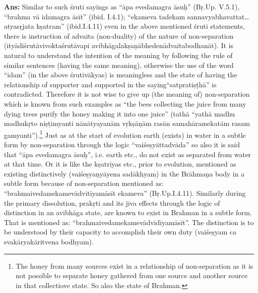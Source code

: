 \textbf{Ans:} Similar to such śruti sayings as “āpa evedamagra āsuḥ” (Bṛ.Up. V.5.1), “brahma vā idamagra āsīt” (ibid. I.4.1); “ekameva tadekam sannavyabhavattat…atyasṛjata kṣatram” (ibid.I.4.11) even in the above mentioned śruti statements, there is instruction of advaita (non-duality) of the nature of non-separation (ityādiśrutāvivoktaśrutāvapi avibhāgalakṣaṇābhedenādvaitabodhanāt). It is natural to understand the intention of the meaning by following the rule of similar sentences (having the same meaning), otherwise the use of the word “idam” (in the above śrutivākyas) is meaningless and the state of having the relationship of supporter and supported in the saying“satpratiṣṭhā” is contradicted. Therefore it is not wise to give up (the meaning of) non-separation which is known from such examples as “the bees collecting the juice from many dying trees purify the honey making it into one juice” (tathā “yathā madhu madhukṛto niṣṭimyanti nānātyayanām vṛkṣāṇām rasān samahāramekatām rasam gamyanti”).\footnote{The honey from many sources exist in a relationship of non-separation as it is not possible to separate honey gathered from one source and another source in that collectiove state. So also the state of Brahman.} Just as at the start of evolution earth (exists) in water in a subtle form by non-separation through the logic “vaiśeṣyāttadvāda” so also it is said that “āpa evedamagra āsuḥ”, i.e. earth etc., do not exist as separated from water at that time. Or it is like the kṣatriyas etc., prior to evolution, mentioned as existing distinctively (vaiśeṣyaṇyāyena sadākhyam) in the Brāhmaṇa body in a subtle form because of non-separation mentioned as: “brahmaivedamekamevādvitīyamāsīt ekameva” (Bṛ.Up.I.4.11). Similarly during the primary dissolution, prakṛti and its jīva effects through the logic of distinction in an avibhāga state, are known to exist in Brahman in a subtle form. That is mentioned as: “brahmaivedamekamevādvidīyamāsīt”. The distinction is to be understood by their capacity to accomplish their own duty (vaiśeṣyam ca svakāryakāritvena bodhyam). 

